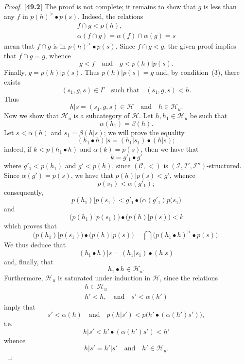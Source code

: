 \documentclass[a4paper,fleqn]{article}
\theoremstyle{plain}
\theoremstyle{definition}
\newenvironment{longcomm}[1]
  {\noindent\textbf{[#1]}\rmfamily}
  {}
\newcommand{\oldpage}[1]{{\marginpar{\footnotesize$\bigg\vert$\,\,\,\,\textit{p.~#1}}}}
\newcommand{\textand}{\quad\text{and}\quad}
\newcommand{\CC}{\mathcal{C}}
\newcommand{\HH}{\mathcal{H}}
\newcommand{\II}{\mathcal{I}}
\newcommand{\smallbullet}{\bullet}
\begin{document}
\begin{proof}
  \begin{longcomm}{49.2}
    The proof is not complete;
    it remains to show that $g$ is less than any $f$ in $p(h)^>\smallbullet p(s)$.
    Indeed, the relations
    \[
      \begin{gathered}
        f\cap g
        < p(h),
      \\\alpha(f\cap g)
        = \alpha(f)\cap\alpha(g)
        = s
      \end{gathered}
    \]
    mean that $f\cap g$ is in $p(h)^>\smallbullet p(s)$.
    Since $f\cap g<g$, the given proof implies that $f\cap g=g$, whence
    \[
      g<f
      \textand
      g < p(h)|p(s).
    \]
    Finally, $g=p(h)|p(s)$.
  \end{longcomm}
  Thus $p(h)|p(s)=g$ and, by condition~(3), there exists
  \[
    (s_1,g,s)\in\Gamma
    \quad\text{such that}\quad
    (s_1,g,s) < h.
  \]
  Thus
  \[
    h|s
    = (s_1,g,s)
    \in\HH
    \textand
    h\in\HH_u.
  \]
  Now we show that $\HH_u$ is a subcategory of $\HH$.
  Let $h,h_1\in\HH_u$ be such that
  \[
    \alpha(h_1)
    = \beta(h).
  \]
  Let $s<\alpha(h)$ and $s_1=\beta(h|s)$;
  we will prove the equality
  \[
    (h_1\smallbullet h)|s
    = (h_1|s_1)\smallbullet(h|s);
  \]
  indeed, if $k<p(h_1\smallbullet h)$ and $\alpha(k)=p(s)$, then we have that
  \[
    k = g'_1\smallbullet g'
  \]
  where $g'_1<p(h_1)$ and $g'<p(h)$, since $(\CC,<)$ is $(\II,\II',\II'')$-structured.
  \oldpage{378}
  Since $\alpha(g')=p(s)$, we have that $p(h)|p(s)<g'$, whence
  \[
    p(s_1)<\alpha(g'_1);
  \]
  consequently,
  \[
    p(h_1)|p(s_1)
    < g'_1\smallbullet\big(\alpha(g'_1)p(s_1\big)
  \]
  and
  \[\big(p(h_1)|p(s_1)\big)\smallbullet\big(p(h)|p(s)\big)
    < k
  \]
  which proves that
  \[
    \big(p(h_1)|p(s_1)\big)\smallbullet\big(p(h)|p(s)\big)
    = \bigcap \big(
      p(h_1\smallbullet h)^>\smallbullet p(s)
    \big).
  \]
  We thus deduce that
  \[
    (h_1\smallbullet h)|s
    = (h_1|s_1)\smallbullet(h|s)
  \]
  and, finally, that
  \[
    h_1\smallbullet h\in\HH_u.
  \]
  Furthermore, $\HH_u$ is saturated under induction in $\HH$, since the relations
  \[
    \begin{gathered}
      h\in\HH_u
    \\h'<h,
      \textand
      s'<\alpha(h')
    \end{gathered}
  \]
  imply that
  \[
    s'<\alpha(h)
    \textand
    p(h|s') < p\big(h'\smallbullet(\alpha(h')s')\big),
  \]
  i.e.
  \[
    h|s'
    < h'\smallbullet(\alpha(h')s')
    < h'
  \]
  whence
  \[
    h|s'
    = h'|s'
    \textand
    h'\in\HH_u.
\]
\end{proof}
\end{document}

